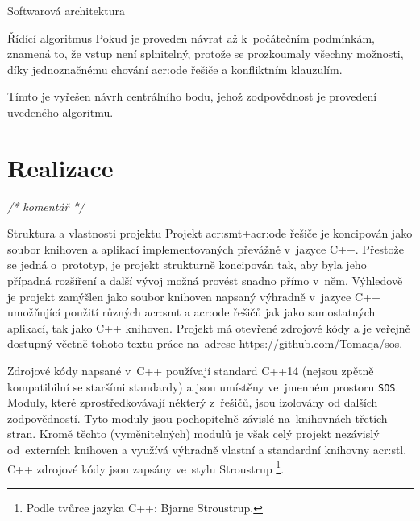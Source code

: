 \documentclass[thesis=M,czech]{FITthesis}[2012/06/26]
\newcommand{\acrlabel}[1]{acr:#1}
\newcommand{\acr}[1]{\acrshort{\acrlabel{#1}}}
\newcommand{\cmt}[1]{\textit{/* #1 */}}
\newcommand{\id}[1]{\texttt{#1}}
\begin{document}
\begin{section}{Softwarová architektura}
\begin{subsection}{Řídící algoritmus}
Pokud je proveden návrat až k~počátečním podmínkám,
znamená to, že vstup není splnitelný,
protože se prozkoumaly všechny možnosti,
díky jednoznačnému chování \acr{ode} řešiče
a konfliktním klauzulím.

Tímto je vyřešen návrh centrálního bodu,
jehož zodpovědnost je provedení uvedeného algoritmu.
\end{subsection} %


\end{section} %



\chapter{Realizace}\label{ch:impl}
\cmt{komentář}


\begin{section}{Struktura a vlastnosti projektu}\label{s:impl:proj}
Projekt \acr{smt}+\acr{ode} řešiče je koncipován
jako soubor knihoven a aplikací
implementovaných převážně v~jazyce C++.
Přestože se jedná o~prototyp, je projekt strukturně koncipován tak,
aby byla jeho případná rozšíření a další vývoj
možná provést snadno přímo v~něm.
Výhledově je projekt zamýšlen jako soubor knihoven
napsaný výhradně v~jazyce C++
umožňující použití různých \acr{smt} a \acr{ode}
řešičů jak jako samostatných aplikací, tak jako C++ knihoven.
Projekt má otevřené zdrojové kódy
a je veřejně dostupný včetně tohoto textu práce na~adrese
\url{https://github.com/Tomaqa/sos}.

Zdrojové kódy napsané v~C++ používají standard C++14
(nejsou zpětně kompatibilní se staršími standardy)
a jsou umístěny ve~jmenném prostoru \id{SOS}.
Moduly, které zprostředkovávají některý z~řešičů,
jsou izolovány od dalších zodpovědností.
Tyto moduly jsou pochopitelně závislé na~knihovnách třetích stran.
Kromě těchto (vyměnitelných) modulů je však celý projekt
nezávislý od~externích knihoven a využívá výhradně
vlastní a standardní knihovny \acr{stl}.
C++ zdrojové kódy jsou zapsány ve~stylu Stroustrup%
\footnote{Podle tvůrce jazyka C++: Bjarne Stroustrup.}.
\end{section} %
\end{document}

